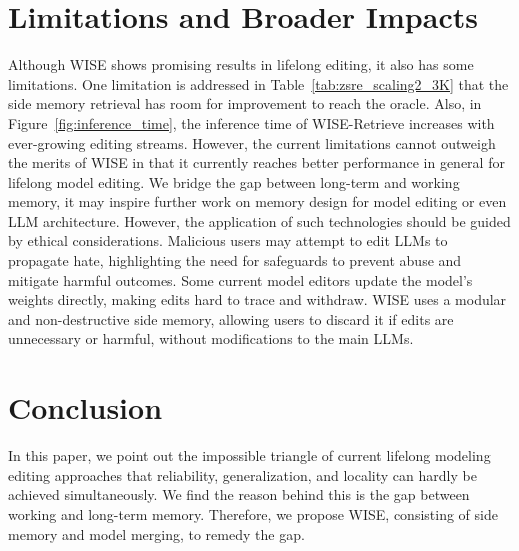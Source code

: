 \documentclass{article}
\begin{document}
\section{Limitations and Broader Impacts} \label{sec: limitation}
Although WISE shows promising results in lifelong editing, it also has some limitations. 
One limitation is addressed in Table~\ref{tab:zsre_scaling2_3K} that the side memory retrieval has room for improvement to reach the oracle. Also, in Figure~\ref{fig:inference_time}, the inference time of WISE-Retrieve increases with ever-growing editing streams. 
However, the current limitations cannot outweigh the merits of WISE in that it currently reaches better performance in general for lifelong model editing.
We bridge the gap between long-term and working memory, it may inspire further work on memory design for model editing or even LLM architecture.
However, the application of such technologies should be guided by ethical considerations.
Malicious users may attempt to edit LLMs to propagate hate, highlighting the need for safeguards to prevent abuse and mitigate harmful outcomes.
Some current model editors update the model's weights directly, making edits hard to trace and withdraw.
WISE uses a modular and non-destructive side memory, allowing users to discard it if edits are unnecessary or harmful, without modifications to the main LLMs.

\section{Conclusion}
In this paper, we point out the impossible triangle of current lifelong modeling editing approaches that reliability, generalization, and locality can hardly be achieved simultaneously. We find the reason behind this is the gap between working and long-term memory. 
Therefore, we propose WISE, consisting of side memory and model merging, to remedy the gap. 
\end{document}
